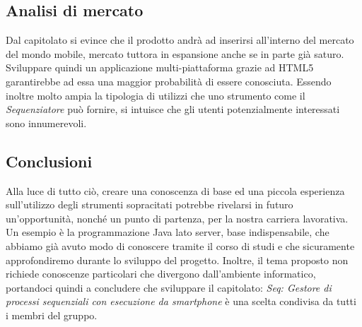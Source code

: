\subsection{Analisi di mercato}
Dal capitolato si evince che il prodotto andrà ad inserirsi all'interno del mercato del mondo mobile, mercato tuttora in espansione anche se in parte già saturo. Sviluppare quindi un applicazione multi-piattaforma grazie ad HTML5 garantirebbe ad essa una maggior probabilità di essere conosciuta.
Essendo inoltre molto ampia la tipologia di utilizzi che uno strumento come il \textit{Sequenziatore} può fornire, si intuisce che gli utenti potenzialmente interessati sono innumerevoli.

\subsection{Conclusioni}
 Alla luce di tutto ciò, creare una conoscenza di base ed una piccola esperienza sull'utilizzo degli strumenti sopracitati potrebbe rivelarsi in futuro un'opportunità, nonché un punto di partenza, per la nostra carriera lavorativa. Un esempio è la programmazione Java lato server, base indispensabile, che abbiamo già avuto modo di conoscere tramite il corso di studi e che sicuramente approfondiremo durante lo sviluppo del progetto. Inoltre, il tema proposto non richiede conoscenze particolari che divergono dall'ambiente informatico, portandoci quindi a concludere che sviluppare il capitolato: \textit{Seq: Gestore di processi sequenziali con esecuzione da smartphone} è una scelta condivisa da tutti i membri del gruppo. \\